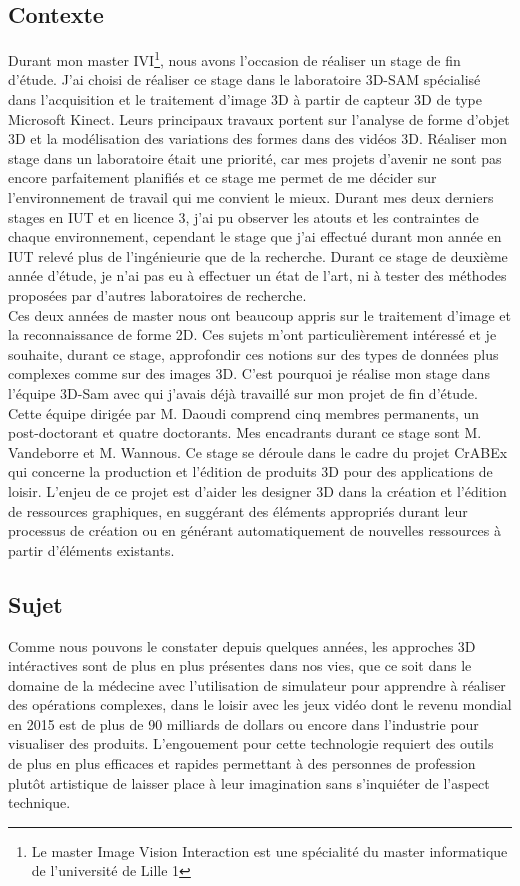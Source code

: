 \subsection{Contexte}
Durant mon master IVI\footnote{Le master Image Vision Interaction est 
une spécialité du master informatique de l'université de Lille 1}, 
nous avons l'occasion de réaliser un stage de fin d'étude. J'ai choisi de réaliser ce stage
dans le laboratoire 3D-SAM spécialisé dans l'acquisition et le traitement d'image 3D 
à partir de capteur 3D de type Microsoft Kinect. Leurs principaux travaux portent sur
l'analyse de forme d'objet 3D et la modélisation des variations des formes dans des
vidéos 3D. Réaliser mon stage dans un laboratoire était une priorité, car mes projets d'avenir
ne sont pas encore parfaitement planifiés et ce stage me permet de me décider sur l'environnement
de travail qui me convient le mieux. Durant mes deux derniers stages en IUT et en licence 3, j'ai pu
observer les atouts et les contraintes de chaque environnement, cependant le stage que j'ai effectué 
durant mon année en IUT relevé plus de l'ingénieurie que de la recherche. Durant ce stage de deuxième
année d'étude, je n'ai pas eu à effectuer un état de l'art, ni à tester des méthodes proposées par 
d'autres laboratoires de recherche.\\

Ces deux années de master nous ont beaucoup appris sur le traitement d'image et la reconnaissance de 
forme 2D. Ces sujets m'ont particulièrement intéressé et je souhaite, durant ce stage, approfondir ces
notions sur des types de données plus complexes comme sur des images 3D. C'est pourquoi je réalise mon
stage dans l'équipe 3D-Sam avec qui j'avais déjà travaillé sur mon projet de fin d'étude. Cette équipe
dirigée par M. Daoudi comprend cinq membres permanents, un post-doctorant et quatre doctorants. Mes 
encadrants durant ce stage sont M. Vandeborre et M. Wannous. Ce stage se déroule dans le cadre du
projet CrABEx qui concerne la production et l'édition de produits 3D pour des applications de
loisir. L'enjeu de ce projet est d'aider les designer 3D dans la création et l'édition de ressources
graphiques, en suggérant des éléments appropriés durant leur processus de création ou en générant automatiquement 
de nouvelles ressources à partir d'éléments existants.

\subsection{Sujet}
Comme nous pouvons le constater depuis quelques années, les approches 3D intéractives sont de plus en plus 
présentes dans nos vies, que ce soit dans le domaine de la médecine avec l'utilisation de simulateur
pour apprendre à réaliser des opérations complexes, dans le loisir avec les jeux vidéo dont le revenu
mondial en 2015 est de plus de 90 milliards de dollars ou encore dans l'industrie pour visualiser des produits.
L'engouement pour cette technologie requiert des outils de plus en plus efficaces et rapides permettant à
des personnes de profession plutôt artistique de laisser place à leur imagination sans s'inquiéter de 
l'aspect technique.\\

